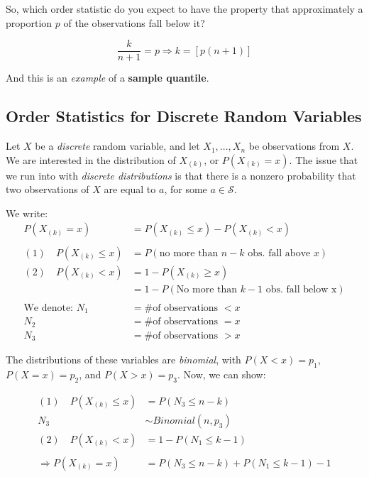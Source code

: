 \documentclass{article}
\newcommand{\ord}[1]{X_{(#1)}}
\begin{document}
\noindent So, which order statistic do you expect to have the property that approximately a proportion $p$ of the observations fall below it?

\begin{equation*}
    \frac{k}{n+1} = p \Rightarrow k = [p(n+1)]
\end{equation*}

And this is an \textit{example} of a \textbf{sample quantile}.


\subsection{Order Statistics for Discrete Random Variables}

Let $X$ be a \textit{discrete} random variable, and let $X_1,...,X_n$ be observations from $X$. We are interested in the distribution of $\ord{k}$, or $P(\ord{k} = x)$. The issue that we run into with \textit{discrete distributions} is that there is a nonzero probability that two observations of $X$ are equal to $a$, for some $a\in \mathcal{S}$.

We write:
\begin{equation*}
    \begin{split}
        P(\ord{k} = x) &= P(\ord{k} \leq x) - P(\ord{k}<x)\\
        \\
        (1) \quad P(\ord{k}\leq x) &= P(\text{no more than $n-k$ obs. fall above $x$})\\
        (2) \quad P(\ord{k}< x) &= 1-P(\ord{k}\geq x)\\
        &= 1-P(\text{No more than $k-1$ obs. fall below x})\\
        \\
        \text{We denote: } N_1 &= \text{\# of observations $< x$}\\
                N_2 &= \text{\# of observations $= x$}\\
                N_3 &= \text{\# of observations $> x$}
    \end{split}
\end{equation*}

The distributions of these variables are \textit{binomial}, with $P(X<x) = p_1$, $P(X=x) = p_2$, and $P(X>x) = p_3$. Now, we can show:

\begin{equation*}
    \begin{split}
        (1) \quad P(\ord{k} \leq x) &= P(N_3 \leq n-k)\\
                                    N_3&\sim Binomial(n,p_3)\\
                                    (2) \quad P(\ord{k} <x) &= 1 - P(N_1 \leq k-1)\\
                                    \\
                                    \Rightarrow P(\ord{k} = x) &= P(N_3 \leq n-k) + P(N_1 \leq k-1) - 1
    \end{split}
\end{equation*}
\end{document}
